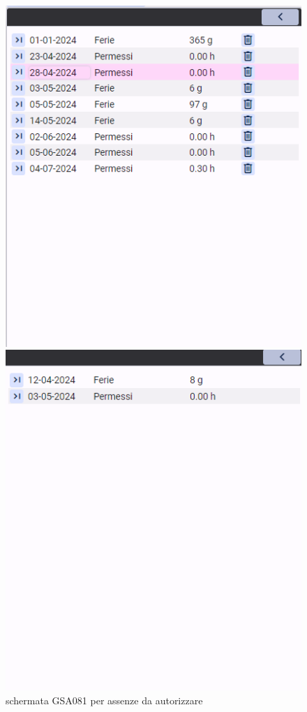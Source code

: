 \documentclass[target=bach,aauheader=,style=]{thud}
\begin{document}
\begin{figure}[h]
    \centering
    \begin{minipage}{0.3\textwidth}
        \centering
        \includegraphics[width=\linewidth]{screenshot/Interfaccia_gsa081_DAU.png}
        \caption{schermata GSA081 per assenze da autorizzare}
    \end{minipage}
    \hfill
    \begin{minipage}{0.3\textwidth}
        \centering
        \includegraphics[width=\linewidth]{screenshot/Interfaccia_gsa081_AUT.png}

\end{minipage}
\end{figure}
\end{document}
